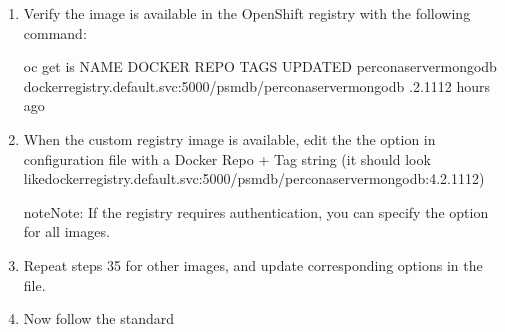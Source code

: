 \documentclass[letterpaper,10pt,english]{sphinxmanual}
\begin{document}
\begin{enumerate}
\item {} 
Verify the image is available in the OpenShift registry with the following command:

\begin{sphinxVerbatim}[commandchars=\\\{\}]
\PYGZdl{} oc get is
NAME                              DOCKER REPO                                                             TAGS             UPDATED
percona\PYGZhy{}server\PYGZhy{}mongodb            docker\PYGZhy{}registry.default.svc:5000/psmdb/percona\PYGZhy{}server\PYGZhy{}mongodb  .2.11\PYGZhy{}12   hours ago
\end{sphinxVerbatim}

\item {} 
When the custom registry image is available, edit the the  option in  configuration file with a Docker Repo + Tag string (it should look like\textasciigrave{}\textasciigrave{}docker\sphinxhyphen{}registry.default.svc:5000/psmdb/percona\sphinxhyphen{}server\sphinxhyphen{}mongodb:4.2.11\sphinxhyphen{}12\textasciigrave{}\textasciigrave{})

\begin{sphinxadmonition}{note}{Note:}
If the registry requires authentication, you can specify the  option for all images.
\end{sphinxadmonition}

\item {} 
Repeat steps 3\sphinxhyphen{}5 for other images, and update corresponding options
in the  file.

\item {} 
Now follow the standard 

\end{enumerate}
\end{document}
